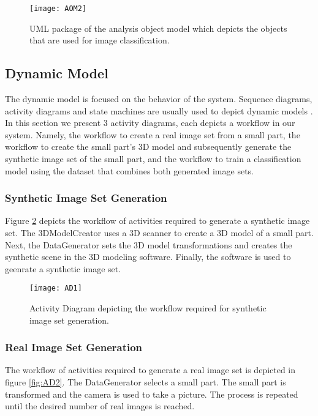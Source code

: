 \begin{figure}[H]
\centering
  \texttt{[image: AOM2]}
\caption{UML package of the analysis object model which depicts the objects that are used for image classification.}
\label{fig:AOM2}
\end{figure}

\newpage
\subsection{Dynamic Model}\label{dynamic_model}
The dynamic model is focused on the behavior of the system. Sequence diagrams, activity diagrams and state machines are usually used to depict dynamic models \cite{bruegge2004object}. In this section we present 3 activity diagrams, each depicts a workflow in our system. Namely, the workflow to create a real image set from a small part, the workflow to create the small part's 3D model and subsequently generate the synthetic image set of the small part, and the workflow to train a classification model using the dataset that combines both generated image sets.

\subsubsection{Synthetic Image Set Generation}
Figure \ref{fig:AD1} depicts the workflow of activities required to generate a synthetic image set. The 3DModelCreator uses a 3D scanner to create a 3D model of a small part. Next, the DataGenerator sets the 3D model transformations and creates the synthetic scene in the 3D modeling software. Finally, the software is used to geenrate a synthetic image set.

\begin{figure}[H]
\centering
  \texttt{[image: AD1]}
\caption{Activity Diagram depicting the workflow required for synthetic image set generation.}
\label{fig:AD1}
\end{figure}

\subsubsection{Real Image Set Generation}
The workflow of activities required to generate a real image set is depicted in figure \ref{fig:AD2}. The DataGenerator selects a small part. The small part is transformed and the camera is used to take a picture. The process is repeated until the desired number of real images is reached.

